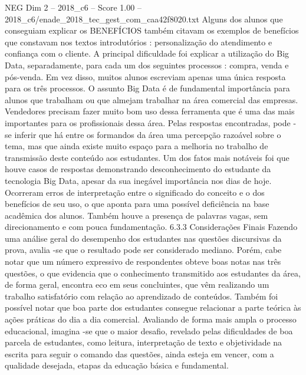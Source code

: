 \begin{textsample}{NEG Dim 2 – 2018\_c6 – Score 1.00 – 2018\_c6/enade\_2018\_tec\_gest\_com\_caa42f8020.txt}
Alguns dos alunos que conseguiam explicar os BENEFÍCIOS também citavam os exemplos de benefícios que constavam nos textos introdutórios : personalização do atendimento e confiança com o cliente.
A principal dificuldade foi explicar a utilização do Big Data, separadamente, para cada um dos seguintes processos : compra, venda e pós-venda.
Em vez disso, muitos alunos escreviam apenas uma única resposta para os três processos.
O assunto Big Data é de fundamental importância para alunos que trabalham ou que almejam trabalhar na área comercial das empresas.
Vendedores precisam fazer muito bom uso dessa ferramenta que é uma das mais importantes para os profissionais dessa área.
Pelas respostas encontradas, pode -se inferir que há entre os formandos da área uma percepção razoável sobre o tema, mas que ainda existe muito espaço para a melhoria no trabalho de transmissão deste conteúdo aos estudantes.
Um dos fatos mais notáveis foi que houve casos de respostas demonstrando desconhecimento do estudante da tecnologia Big Data, apesar da sua inegável importância nos dias de hoje.
Ocorreram erros de interpretação entre o significado do conceito e o dos benefícios de seu uso, o que aponta para uma possível deficiência na base acadêmica dos alunos.
Também houve a presença de palavras vagas, sem direcionamento e com pouca fundamentação. 6.3.3 Considerações Finais Fazendo uma análise geral do desempenho dos estudantes nas questões discursivas da prova, avalia -se que o resultado pode ser considerado mediano.
Porém, cabe notar que um número expressivo de respondentes obteve boas notas nas três questões, o que evidencia que o conhecimento transmitido aos estudantes da área, de forma geral, encontra eco em seus concluintes, que vêm realizando um trabalho satisfatório com relação ao aprendizado de conteúdos.
Também foi possível notar que boa parte dos estudantes consegue relacionar a parte teórica às ações práticas do dia a dia comercial.
Avaliando de forma mais ampla o processo educacional, imagina -se que o maior desafio, revelado pelas dificuldades de boa parcela de estudantes, como leitura, interpretação de texto e objetividade na escrita para seguir o comando das questões, ainda esteja em vencer, com a qualidade desejada, etapas da educação básica e fundamental.

\end{textsample}
